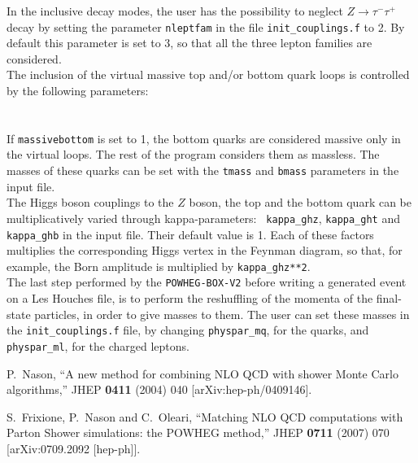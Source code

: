 \documentclass[paper]{JHEP3}
\newcommand\POWHEGBOXV{{\tt POWHEG-BOX-V2}}
\begin{document}
{\noindent In the inclusive decay modes, the user has the possibility to
neglect $Z \to \tau^-\tau^+$ decay by setting the parameter {\tt nleptfam} in
the file {\tt init\_couplings.f} to 2. By default this parameter is set to 3,
so that all the three lepton families are considered.\\

\noindent The inclusion of the virtual massive top and/or bottom quark loops
is controlled by the following parameters:\\
\\
\\
%
If {\tt massivebottom} is set to 1, the bottom quarks are considered massive
only in the virtual loops. The rest of the program considers them as
massless. The masses of these quarks can be set with the {\tt tmass} and
{\tt bmass} parameters in the input file.\\


\noindent The Higgs boson couplings to the $Z$ boson, the top and the bottom
quark can be multiplicatively varied through kappa-parameters: {\tt
  kappa\_ghz}, {\tt kappa\_ght} and {\tt kappa\_ghb} in the input file. Their
default value is 1. Each of these factors multiplies the corresponding Higgs
vertex in the Feynman diagram, so that, for example, the Born amplitude is
multiplied by {\tt kappa\_ghz**2}. \\

\noindent The last step performed by the \POWHEGBOXV{} before writing a
generated event on a Les Houches file, is to perform the reshuffling of the
momenta of the final-state particles, in order to give masses to them. The
user can set these masses in the {\tt init\_couplings.f} file, by changing
{\tt physpar\_mq}, for the quarks, and {\tt physpar\_ml}, for the charged
leptons.


\begin{thebibliography}{10}

  P.~Nason,
  ``A new method for combining NLO QCD with shower Monte Carlo algorithms,''
  JHEP {\bf 0411} (2004) 040
  [arXiv:hep-ph/0409146].

  S.~Frixione, P.~Nason and C.~Oleari,
``Matching NLO QCD computations with Parton Shower simulations: the POWHEG
method,''
  JHEP {\bf 0711} (2007) 070
  [arXiv:0709.2092 [hep-ph]].


\end{thebibliography}}
\end{document}
